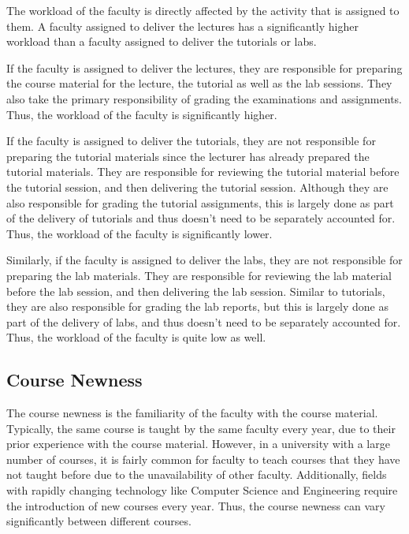 The workload of the faculty is directly affected by the activity that is assigned to them. A faculty assigned to deliver the lectures has a significantly higher workload than a faculty assigned to deliver the tutorials or labs.

If the faculty is assigned to deliver the lectures, they are responsible for preparing the course material for the lecture, the tutorial as well as the lab sessions. They also take the primary responsibility of grading the examinations and assignments. Thus, the workload of the faculty is significantly higher.

If the faculty is assigned to deliver the tutorials, they are not responsible for preparing the tutorial materials since the lecturer has already prepared the tutorial materials. They are responsible for reviewing the tutorial material before the tutorial session, and then delivering the tutorial session. Although they are also responsible for grading the tutorial assignments, this is largely done as part of the delivery of tutorials and thus doesn't need to be separately accounted for. Thus, the workload of the faculty is significantly lower.

Similarly, if the faculty is assigned to deliver the labs, they are not responsible for preparing the lab materials. They are responsible for reviewing the lab material before the lab session, and then delivering the lab session. Similar to tutorials, they are also responsible for grading the lab reports, but this is largely done as part of the delivery of labs, and thus doesn't need to be separately accounted for. Thus, the workload of the faculty is quite low as well.

\subsection{Course Newness}

The course newness is the familiarity of the faculty with the course material. Typically, the same course is taught by the same faculty every year, due to their prior experience with the course material. However, in a university with a large number of courses, it is fairly common for faculty to teach courses that they have not taught before due to the unavailability of other faculty. Additionally, fields with rapidly changing technology like Computer Science and Engineering require the introduction of new courses every year. Thus, the course newness can vary significantly between different courses.

